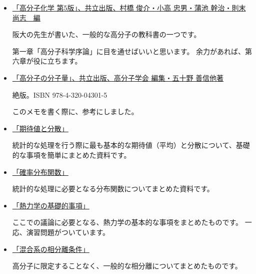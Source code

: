\documentclass[a4paper,11pt]{ltjsarticle}
\begin{document}
\begin{itemize}
\item
\href{http://www.kyoritsu-pub.co.jp/bookdetail/9784320043800}{「高分子化学 第5版」、共立出版、村橋 俊介・小高 忠男・蒲池 幹治・則末 尚志　編}

阪大の先生が書いた、一般的な高分子の教科書の一つです。

第一章「高分子科学序論」に目を通せばいいと思います。
余力があれば、第六章が役に立ちます。

\item
\href{http://www.kyoritsu-pub.co.jp/bookdetail/9784320043015}{「高分子の分子量」、共立出版、高分子学会 編集・五十野 善信他著}

絶版。ISBN	978-4-320-04301-5

このメモを書く際に、参考にしました。

\item
\href{https://dl.dropboxusercontent.com/u/18899343/Probability/Kitaiti_Bunsan/EV_Var.pdf}{「期待値と分散」}

統計的な処理を行う際に最も基本的な期待値（平均）と分散について、基礎的な事項を簡単にまとめた資料です。

\item
\href{https://dl.dropboxusercontent.com/u/18899343/Probability/Prob_Dist/Prob_Dist.pdf}{「確率分布関数」}

統計的な処理に必要となる分布関数についてまとめた資料です。


\item
\href{https://dl.dropboxusercontent.com/u/18899343/Thermo_Dynamics/basics/Thermo_Dynamics_basics.pdf}{「熱力学の基礎的事項」}

ここでの議論に必要となる、熱力学の基本的な事項をまとめたものです。
一応、演習問題がついています。

\item
\href{https://dl.dropboxusercontent.com/u/18899343/physics/FreeEnergyForm/Free_Energy_Form.pdf}{「混合系の相分離条件」}

高分子に限定することなく、一般的な相分離についてまとめたものです。

%
%
%
%
%


\end{itemize}
\end{document}
